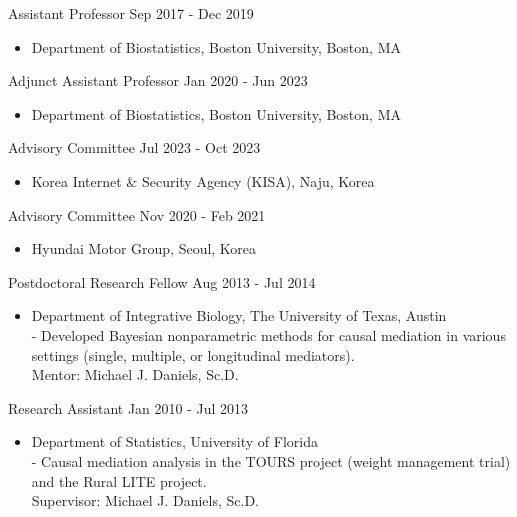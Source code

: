 \documentclass[10pt]{article}
\newenvironment{innerlist}[1][\enskip\textbullet]%
        {\begin{itemize}[#1,leftmargin=*,parsep=0pt,itemsep=0pt,topsep=0pt,partopsep=0pt]}
        {\end{itemize}}
\begin{document}
Assistant Professor \hfill {Sep 2017 - Dec 2019}
\begin{innerlist}
\item[] Department of Biostatistics, Boston University, Boston, MA\\
\end{innerlist}

Adjunct Assistant Professor \hfill {Jan 2020 - Jun 2023}
\begin{innerlist}
\item[] Department of Biostatistics, Boston University, Boston, MA\\
\end{innerlist}

Advisory Committee \hfill {Jul 2023 - Oct 2023}
\begin{innerlist}
\item[] Korea Internet \& Security Agency (KISA), Naju, Korea\\
\end{innerlist}


Advisory Committee \hfill {Nov 2020 - Feb 2021}
\begin{innerlist}
\item[] Hyundai Motor Group, Seoul, Korea\\
\end{innerlist}


Postdoctoral Research Fellow \hfill {Aug 2013 - Jul 2014}
\begin{innerlist}
\item[] Department of Integrative Biology, The University of Texas, Austin\\
        - Developed Bayesian nonparametric methods for causal mediation in various settings (single, multiple, or longitudinal mediators).\\
        Mentor: Michael J. Daniels, Sc.D.
\end{innerlist}

\vspace{0.2cm}

Research Assistant \hfill {Jan 2010 - Jul 2013}
\begin{innerlist}
\item[] Department of Statistics, University of Florida\\
        - Causal mediation analysis in the TOURS project (weight management
        trial) and the Rural LITE project.\\
        Supervisor: Michael J. Daniels, Sc.D.
\end{innerlist}
\end{document}
